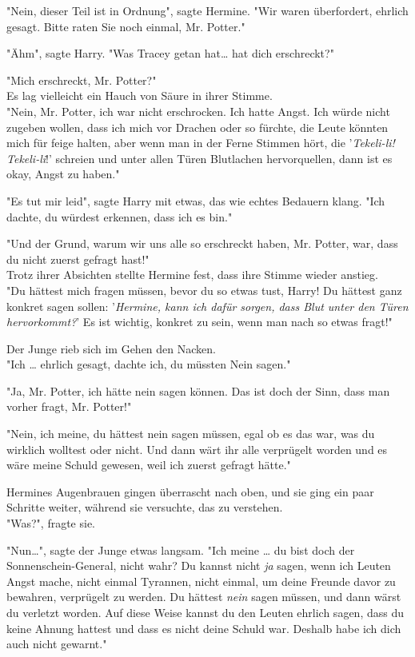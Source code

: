 {"Nein, dieser Teil ist in Ordnung", sagte Hermine. "Wir waren überfordert, ehrlich gesagt. Bitte raten Sie noch einmal, Mr. Potter."

"Ähm", sagte Harry. "Was Tracey getan hat… hat dich erschreckt?"

"Mich erschreckt, Mr. Potter?"\\ Es lag vielleicht ein Hauch von Säure in ihrer Stimme.\\ "Nein, Mr. Potter, ich war nicht erschrocken. Ich hatte Angst. Ich würde nicht zugeben wollen, dass ich mich vor Drachen oder so fürchte, die Leute könnten mich für feige halten, aber wenn man in der Ferne Stimmen hört, die '\emph{Tekeli-li! Tekeli-li}!' schreien und unter allen Türen Blutlachen hervorquellen, dann ist es okay, Angst zu haben."

"Es tut mir leid", sagte Harry mit etwas, das wie echtes Bedauern klang. "Ich dachte, du würdest erkennen, dass ich es bin."

"Und der Grund, warum wir uns alle so erschreckt haben, Mr. Potter, war, dass du nicht zuerst gefragt hast!"\\ Trotz ihrer Absichten stellte Hermine fest, dass ihre Stimme wieder anstieg.\\ "Du hättest mich fragen müssen, bevor du so etwas tust, Harry! Du hättest ganz konkret sagen sollen: '\emph{Hermine, kann ich dafür sorgen, dass Blut unter den Türen hervorkommt?}' Es ist wichtig, konkret zu sein, wenn man nach so etwas fragt!"

Der Junge rieb sich im Gehen den Nacken.\\ "Ich … ehrlich gesagt, dachte ich, du müssten Nein sagen."

"Ja, Mr. Potter, ich hätte nein sagen können. Das ist doch der Sinn, dass man vorher fragt, Mr. Potter!"

"Nein, ich meine, du hättest nein sagen müssen, egal ob es das war, was du wirklich wolltest oder nicht. Und dann wärt ihr alle verprügelt worden und es wäre meine Schuld gewesen, weil ich zuerst gefragt hätte."

Hermines Augenbrauen gingen überrascht nach oben, und sie ging ein paar Schritte weiter, während sie versuchte, das zu verstehen.\\ "Was?", fragte sie.

"Nun…", sagte der Junge etwas langsam. "Ich meine … du bist doch der Sonnenschein-General, nicht wahr? Du kannst nicht \emph{ja} sagen, wenn ich Leuten Angst mache, nicht einmal Tyrannen, nicht einmal, um deine Freunde davor zu bewahren, verprügelt zu werden. Du hättest \emph{nein} sagen müssen, und dann wärst du verletzt worden. Auf diese Weise kannst du den Leuten ehrlich sagen, dass du keine Ahnung hattest und dass es nicht deine Schuld war. Deshalb habe ich dich auch nicht gewarnt."

}
